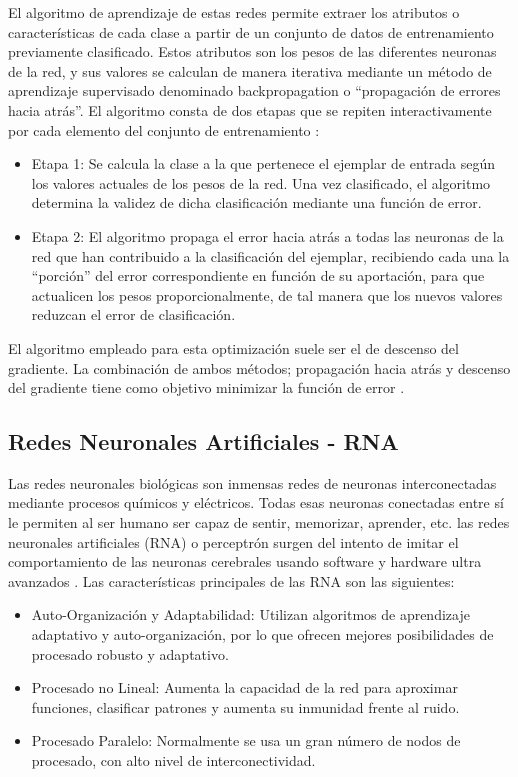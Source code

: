 El algoritmo de aprendizaje de estas redes permite extraer los atributos o características de cada clase a partir de un conjunto de datos de entrenamiento previamente clasificado. Estos atributos son los pesos de las diferentes neuronas de la red, y sus valores se calculan de manera iterativa mediante un método de aprendizaje supervisado denominado backpropagation o “propagación de errores hacia atrás”\cite{lecun1989backpropagation,chauvin1995backpropagation}. El algoritmo consta de dos etapas que se repiten interactivamente por cada elemento del conjunto de entrenamiento \cite{hecht1992theory}:
\begin{itemize}
    \item Etapa 1: Se calcula la clase a la que pertenece el ejemplar de entrada según los valores actuales de los pesos de la red. Una vez clasificado, el algoritmo determina la validez de dicha clasificación mediante una función de error.
    \item Etapa 2: El algoritmo propaga el error hacia atrás a todas las neuronas de la red que han contribuido a la clasificación del ejemplar, recibiendo cada una la “porción” del error correspondiente en función de su aportación, para que actualicen los pesos proporcionalmente, de tal manera que los nuevos valores reduzcan el error de clasificación. 
\end{itemize}
El algoritmo empleado para esta optimización suele ser el de descenso del gradiente. La combinación de ambos métodos; propagación hacia atrás y descenso del gradiente tiene como objetivo minimizar la función de error \cite{marin2013introduccion}.

\subsection{Redes Neuronales Artificiales - RNA}

Las redes neuronales biológicas son inmensas redes de neuronas interconectadas mediante procesos químicos y eléctricos. Todas esas neuronas conectadas entre sí le permiten al ser humano ser capaz de sentir, memorizar, aprender, etc. las redes neuronales artificiales (RNA) o perceptrón surgen del intento de imitar el comportamiento de las neuronas cerebrales usando software y hardware ultra avanzados \cite{marin2013introduccion}. Las características principales de las RNA son las siguientes:

\begin{itemize}
    \item Auto-Organización y Adaptabilidad: Utilizan algoritmos de aprendizaje adaptativo y auto-organización, por lo que ofrecen mejores posibilidades de procesado robusto y adaptativo.
    \item Procesado no Lineal: Aumenta la capacidad de la red para aproximar funciones, clasificar patrones y aumenta su inmunidad frente al ruido. 
    \item Procesado Paralelo: Normalmente se usa un gran número de nodos de procesado, con alto nivel de interconectividad.
\end{itemize}

